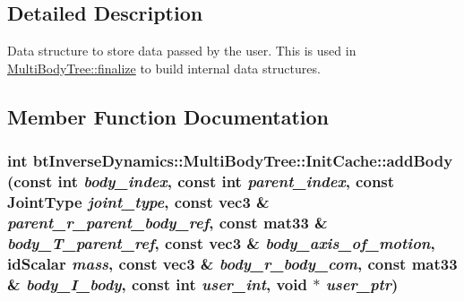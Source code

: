 \subsection{Detailed Description}
Data structure to store data passed by the user. This is used in \hyperlink{classbt_inverse_dynamics_1_1_multi_body_tree_c82772ed5bebb1edd6513c03ebd719c2}{MultiBodyTree::finalize} to build internal data structures. 

\subsection{Member Function Documentation}
\hypertarget{classbt_inverse_dynamics_1_1_multi_body_tree_1_1_init_cache_3140b788b6cdc6c5a74cf2da2e8f5fac}{
\subsubsection[addBody]{\setlength{\rightskip}{0pt plus 5cm}int btInverseDynamics::MultiBodyTree::InitCache::addBody (const int {\em body\_\-index}, \/  const int {\em parent\_\-index}, \/  const JointType {\em joint\_\-type}, \/  const {\bf vec3} \& {\em parent\_\-r\_\-parent\_\-body\_\-ref}, \/  const mat33 \& {\em body\_\-T\_\-parent\_\-ref}, \/  const {\bf vec3} \& {\em body\_\-axis\_\-of\_\-motion}, \/  idScalar {\em mass}, \/  const {\bf vec3} \& {\em body\_\-r\_\-body\_\-com}, \/  const mat33 \& {\em body\_\-I\_\-body}, \/  const int {\em user\_\-int}, \/  void $\ast$ {\em user\_\-ptr})}}
\label{classbt_inverse_dynamics_1_1_multi_body_tree_1_1_init_cache_3140b788b6cdc6c5a74cf2da2e8f5fac}


